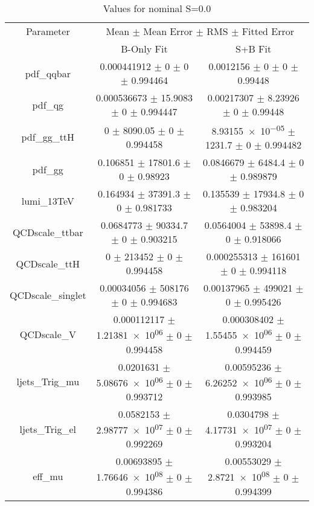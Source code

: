 \begin{table}
\centering
\caption{Values for nominal S=0.0}
\begin{tabular}{ccc}
\toprule
Parameter & \multicolumn{2}{c}{Mean $\pm$ Mean Error $\pm$ RMS $\pm$ Fitted Error}\\
 & B-Only Fit & S+B Fit\\
\midrule
pdf\_qqbar & \num{0.000441912} $\pm$ \num{0} $\pm$ \num{0} $\pm$ \num{0.994464} & \num{0.0012156} $\pm$ \num{0} $\pm$ \num{0} $\pm$ \num{0.99448}\\
pdf\_qg & \num{0.000536673} $\pm$ \num{15.9083} $\pm$ \num{0} $\pm$ \num{0.994447} & \num{0.00217307} $\pm$ \num{8.23926} $\pm$ \num{0} $\pm$ \num{0.99448}\\
pdf\_gg\_ttH & \num{0} $\pm$ \num{8090.05} $\pm$ \num{0} $\pm$ \num{0.994458} & \num{8.93155e-05} $\pm$ \num{1231.7} $\pm$ \num{0} $\pm$ \num{0.994482}\\
pdf\_gg & \num{0.106851} $\pm$ \num{17801.6} $\pm$ \num{0} $\pm$ \num{0.98923} & \num{0.0846679} $\pm$ \num{6484.4} $\pm$ \num{0} $\pm$ \num{0.989879}\\
lumi\_13TeV & \num{0.164934} $\pm$ \num{37391.3} $\pm$ \num{0} $\pm$ \num{0.981733} & \num{0.135539} $\pm$ \num{17934.8} $\pm$ \num{0} $\pm$ \num{0.983204}\\
QCDscale\_ttbar & \num{0.0684773} $\pm$ \num{90334.7} $\pm$ \num{0} $\pm$ \num{0.903215} & \num{0.0564004} $\pm$ \num{53898.4} $\pm$ \num{0} $\pm$ \num{0.918066}\\
QCDscale\_ttH & \num{0} $\pm$ \num{213452} $\pm$ \num{0} $\pm$ \num{0.994458} & \num{0.000255313} $\pm$ \num{161601} $\pm$ \num{0} $\pm$ \num{0.994118}\\
QCDscale\_singlet & \num{0.00034056} $\pm$ \num{508176} $\pm$ \num{0} $\pm$ \num{0.994683} & \num{0.00137965} $\pm$ \num{499021} $\pm$ \num{0} $\pm$ \num{0.995426}\\
QCDscale\_V & \num{0.000112117} $\pm$ \num{1.21381e+06} $\pm$ \num{0} $\pm$ \num{0.994458} & \num{0.000308402} $\pm$ \num{1.55455e+06} $\pm$ \num{0} $\pm$ \num{0.994459}\\
ljets\_Trig\_mu & \num{0.0201631} $\pm$ \num{5.08676e+06} $\pm$ \num{0} $\pm$ \num{0.993712} & \num{0.00595236} $\pm$ \num{6.26252e+06} $\pm$ \num{0} $\pm$ \num{0.993985}\\
ljets\_Trig\_el & \num{0.0582153} $\pm$ \num{2.98777e+07} $\pm$ \num{0} $\pm$ \num{0.992269} & \num{0.0304798} $\pm$ \num{4.17731e+07} $\pm$ \num{0} $\pm$ \num{0.993204}\\
eff\_mu & \num{0.00693895} $\pm$ \num{1.76646e+08} $\pm$ \num{0} $\pm$ \num{0.994386} & \num{0.00553029} $\pm$ \num{2.8721e+08} $\pm$ \num{0} $\pm$ \num{0.994399}\\

\end{tabular}
\end{table}

